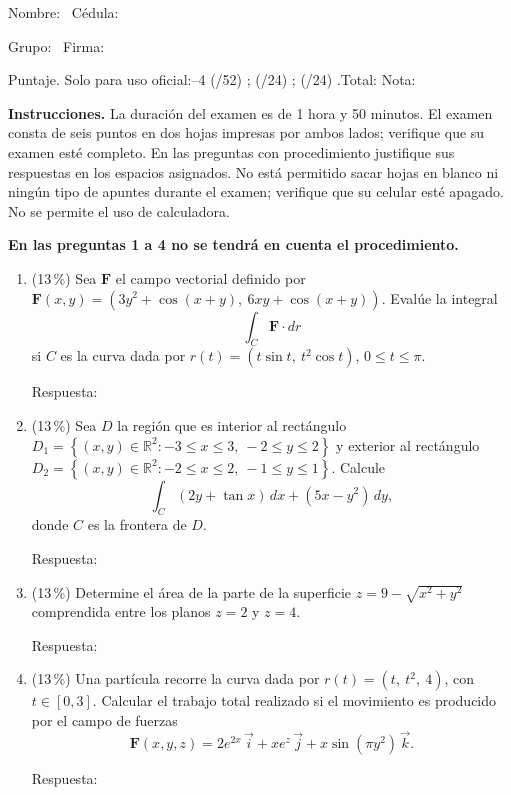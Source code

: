 \documentclass[11pt]{article}
\begin{document}
\examheader

\vspace{4pt}
\noindent Nombre: \dotfill\ Cédula: \dotfill

\vspace{4pt}
\noindent Grupo: \dotfill\ Firma: \dotfill

\vspace{4pt}
\noindent Puntaje. Solo para uso oficial:--4 (/52) \dotfill; (/24) \dotfill; (/24) \dotfill.\quad Total: \dotfill\quad Nota: \dotfill

\vspace{6pt}
\noindent\textbf{Instrucciones.} La duración del examen es de 1 hora y 50 minutos. El examen consta de seis puntos en dos hojas impresas por ambos lados; verifique que su examen esté completo. En las preguntas con procedimiento justifique sus respuestas en los espacios asignados. No está permitido sacar hojas en blanco ni ningún tipo de apuntes durante el examen; verifique que su celular esté apagado. No se permite el uso de calculadora.

\vspace{8pt}
\noindent\textbf{En las preguntas 1 a 4 no se tendrá en cuenta el procedimiento.}

\begin{enumerate}
\item{} (13\,\%) Sea $\mathbf F$ el campo vectorial definido por $\mathbf F(x,y) = \left(3y^2 + \cos(x+y),\ 6xy + \cos(x+y)\right)$. Evalúe la integral
\[
\int_C \mathbf F \cdot dr
\]
si $C$ es la curva dada por $r(t) = (t\sin t,\ t^2\cos t)$, $0 \leq t \leq \pi$.

\vspace{2pt}
\noindent Respuesta: \underline{\phantom{XXXXXXXXXXXX}}

\item{} (13\,\%) Sea $D$ la región que es interior al rectángulo $D_1 = \left\{(x,y)\in\mathbb{R}^2 : -3 \leq x \leq 3,\ -2 \leq y \leq 2\right\}$ y exterior al rectángulo $D_2 = \left\{(x,y)\in\mathbb{R}^2 : -2 \leq x \leq 2,\ -1 \leq y \leq 1\right\}$. Calcule
\[
\int_C (2y + \tan x)\,dx + (5x - y^2)\,dy,
\]
donde $C$ es la frontera de $D$.

\vspace{2pt}
\noindent Respuesta: \underline{\phantom{XXXXXXXXXXXX}}

\item{} (13\,\%) Determine el área de la parte de la superficie $z = 9 - \sqrt{x^2+y^2}$ comprendida entre los planos $z = 2$ y $z = 4$.

\vspace{2pt}
\noindent Respuesta: \underline{\phantom{XXXXXXXXXXXX}}

\item{} (13\,\%) Una partícula recorre la curva dada por $r(t) = (t,\ t^2,\ 4)$, con $t \in [0,3]$. Calcular el trabajo total realizado si el movimiento es producido por el campo de fuerzas
\[
\mathbf F(x,y,z) = 2e^{2x}\,\vec i + xe^z\,\vec j + x\sin(\pi y^2)\,\vec k.
\]

\vspace{2pt}
\noindent Respuesta: \underline{\phantom{XXXXXXXXXXXX}}
\end{enumerate}
\end{document}
